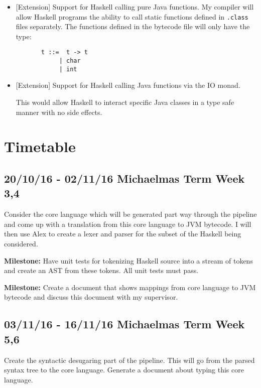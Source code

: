 \documentclass[12pt,a4paper,twoside]{article}
\begin{document}
\begin{itemize}
    \item

      [Extension] Support for Haskell calling pure Java functions.
      My compiler will allow Haskell programs the ability to call static functions defined in \texttt{.class} files separately.
      The functions defined in the bytecode file will only have the type:

      \begin{verbatim}
       t ::=  t -> t
            | char
            | int
      \end{verbatim}

    \item

      [Extension] Support for Haskell calling Java functions via the IO monad.

      This would allow Haskell to interact specific Java classes in a type safe manner with no side effects.

  \end{itemize}

  \section*{Timetable}


    \subsection*{20/10/16 - 02/11/16 \hfill Michaelmas Term Week 3,4}

      Consider the core language which will be generated part way through the pipeline and come up with
      a translation from this core language to JVM bytecode.
      I will then use Alex to create a lexer and parser for the subset of the Haskell being considered.


      \textbf{Milestone:} Have unit tests for tokenizing Haskell source into a stream of tokens and create an AST from these tokens. All unit tests must pass.

      \textbf{Milestone:}
      Create a document that shows mappings from core language to JVM bytecode and discuss this document with my supervisor.


    \subsection*{03/11/16 - 16/11/16 \hfill Michaelmas Term Week 5,6}

      Create the syntactic desugaring part of the pipeline. This will go from the parsed syntax tree to the core language.
      Generate a document about typing this core language.
\end{document}
